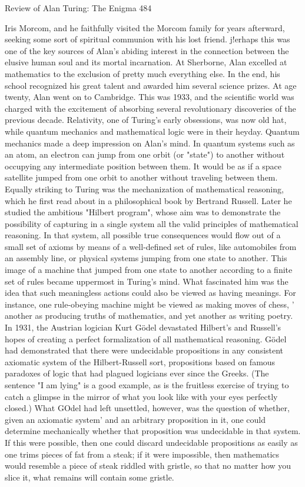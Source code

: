 Review of Alan Turing: The Enigma                                                    484

Iris Morcom, and he faithfully visited the Morcom family for years afterward, seeking
some sort of spiritual communion with his lost friend. j!erhaps this was one of the key
sources of Alan's abiding interest in the connection between the elusive human soul
and its mortal incarnation.
        At Sherborne, Alan excelled at mathematics to the exclusion of pretty much
everything else. In the end, his school recognized his great talent and awarded him
several science prizes. At age twenty, Alan went on to Cambridge. This was 1933,
and the scientific world was charged with the excitement of absorbing several
revolutionary discoveries of the previous decade. Relativity, one of Turing's early
obsessions, was now old hat, while quantum mechanics and mathematical logic were
in their heyday. Quantum mechanics made a deep impression on Alan's mind. In
quantum systems such as an atom, an electron can jump from one orbit (or "state") to
another without occupying any intermediate position between them. It would be as if
a space satellite jumped from one orbit to another without traveling between them.
        Equally striking to Turing was the mechanization of mathematical reasoning,
which he first read about in a philosophical book by Bertrand Russell. Later he
studied the ambitious "Hilbert program", whose aim was to demonstrate the
possibility of capturing in a single system all the valid principles of mathematical
reasoning. In that system, all possible true consequences would flow out of a small set
of axioms by means of a well-defined set of rules, like automobiles from an assembly
line, or physical systems jumping from one state to another. This image of a machine
that jumped from one state to another according to a finite set of rules became
uppermost in Turing's mind. What fascinated him was the idea that such meaningless
actions could also be viewed as having meanings. For instance, one rule-obeying
machine might be viewed as making moves of chess, ' another as producing truths of
mathematics, and yet another as writing poetry.
        In 1931, the Austrian logician Kurt Gödel devastated Hilbert's and Russell's
hopes of creating a perfect formalization of all mathematical reasoning. Gödel had
demonstrated that there were undecidable propositions in any consistent axiomatic
system of the Hilbert-Russell sort, propositions based on famous paradoxes of logic
that had plagued logicians ever since the Greeks. (The sentence "I am lying" is a good
example, as is the fruitless exercise of trying to catch a glimpse in the mirror of what
you look like with your eyes perfectly closed.) What GOdel had left unsettled,
however, was the question of whether, given an axiomatic system' and an arbitrary
proposition in it, one could determine mechanically whether that proposition was
undecidable in that system. If this were possible, then one could discard undecidable
propositions as easily as one trims pieces of fat from a steak; if it were impossible,
then mathematics would resemble a piece of steak riddled with gristle, so that no
matter how you slice it, what remains will contain some gristle.




